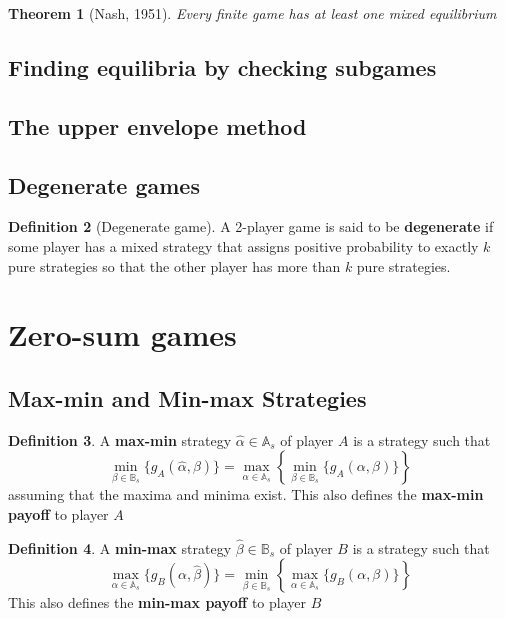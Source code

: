\documentclass[11pt]{article}
\theoremstyle{plain}
\newtheorem{theorem}{Theorem}[section]
\theoremstyle{definition}
\newtheorem{definition}[theorem]{Definition}
\theoremstyle{remark}
\begin{document}
\begin{theorem}[Nash, 1951]
    Every finite game has at least one mixed equilibrium
\end{theorem}
\subsection{Finding equilibria by checking subgames}
\subsection{The upper envelope method}
\subsection{Degenerate games}

\begin{definition}[Degenerate game]
    A 2-player game is said to be \textbf{degenerate} if some player has a mixed strategy that assigns positive probability to exactly \(k\) pure strategies so that the other player has more than \(k\) pure strategies.
\end{definition}

\section{Zero-sum games}

\setcounter{subsection}{2} 
\subsection{Max-min and Min-max Strategies}

\setcounter{theorem}{24} 
\begin{definition}
    A \textbf{max-min} strategy \(\hat{\alpha}  \in \mathbb{A}_{s}\) of player \(A\) is a strategy such that
    \[
        \mathop{\min}_{\beta \in \mathbb{B}_{s}}\{ g_{A}(\hat{\alpha},\beta)\} = \mathop{\max}_{\alpha \in \mathbb{A}_{s}} \left\{ \mathop{\min}_{\beta  \in \mathbb{B}_{s}}\{ g_{A}(\alpha,\beta)\} \right\}
    \]
    assuming that the maxima and minima exist. This also defines the \textbf{max-min payoff} to player \(A\) 
\end{definition}

\begin{definition}
    A \textbf{min-max} strategy \(\hat{\beta}  \in \mathbb{B}_{s}\) of player \(B\) is a strategy such that
    \[
        \mathop{\max}_{\alpha \in \mathbb{A}_{s}}\{ g_{B}(\alpha,\hat{\beta})\} = \mathop{\min}_{\beta \in \mathbb{B}_{s}} \left\{ \mathop{\max}_{\alpha  \in \mathbb{A}_{s}}\{ g_{B}(\alpha,\beta)\} \right\}
    \]
    This also defines the \textbf{min-max payoff} to player \(B\)
\end{definition}
\end{document}
